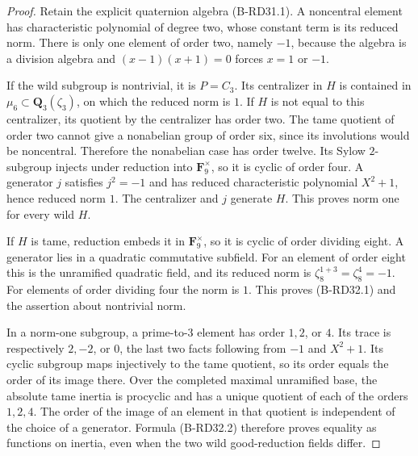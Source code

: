 \begin{proof}
Retain the explicit quaternion algebra (B-RD31.1). A noncentral
element has characteristic polynomial of degree two, whose
constant term is its reduced norm. There is only one element
of order two, namely $-1$, because the algebra is a division
algebra and $(x-1)(x+1)=0$ forces $x=1$ or $-1$.

If the wild subgroup is nontrivial, it is $P=C_3$. Its
centralizer in $H$ is contained in
$\mu_6\subset\mathbf Q_3(\zeta_3)$, on which the reduced norm
is $1$. If $H$ is not equal to this centralizer, its quotient
by the centralizer has order two. The tame quotient of order
two cannot give a nonabelian group of order six, since its
involutions would be noncentral. Therefore the nonabelian
case has order twelve. Its Sylow $2$-subgroup injects under
reduction into $\mathbf F_9^\times$, so it is cyclic of order
four. A generator $j$ satisfies $j^2=-1$ and has reduced
characteristic polynomial $X^2+1$, hence reduced norm $1$.
The centralizer and $j$ generate $H$. This proves norm one
for every wild $H$.

If $H$ is tame, reduction embeds it in $\mathbf F_9^\times$,
so it is cyclic of order dividing eight. A generator lies in
a quadratic commutative subfield. For an element of order
eight this is the unramified quadratic field, and its reduced
norm is $\zeta_8^{1+3}=\zeta_8^4=-1$. For elements of order
dividing four the norm is $1$. This proves (B-RD32.1) and
the assertion about nontrivial norm.

In a norm-one subgroup, a prime-to-$3$ element has order
$1,2$, or $4$. Its trace is respectively $2,-2$, or $0$,
the last two facts following from $-1$ and $X^2+1$.
Its cyclic subgroup maps injectively to the tame quotient,
so its order equals the order of its image there.
Over the completed maximal unramified base, the absolute
tame inertia is procyclic and has a unique quotient of each
of the orders $1,2,4$. The order of the image of an element
in that quotient is independent of the choice of a generator.
Formula (B-RD32.2) therefore proves equality as functions on
inertia, even when the two wild good-reduction fields differ.
\end{proof}


